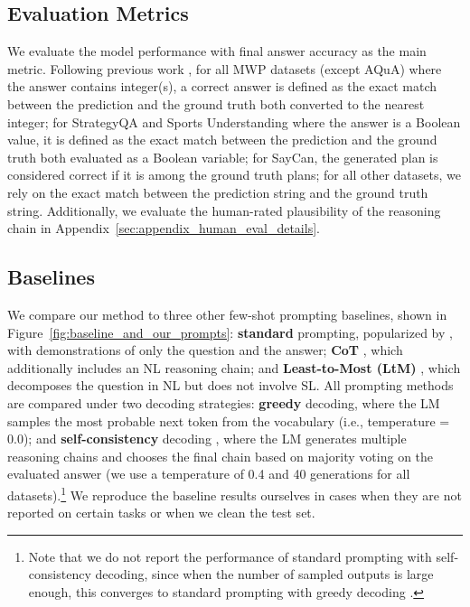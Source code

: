 \documentclass[11pt]{article}
\begin{document}
\subsection{Evaluation Metrics} We evaluate the model performance with final answer accuracy as the main metric. Following previous work \cite{wei_chain_2022, wang_self-consistency_2022, chen_program_2022}, for all MWP datasets (except AQuA) where the answer contains integer(s), a correct answer is defined as the exact match between the prediction and the ground truth both converted to the nearest integer; for StrategyQA and Sports Understanding where the answer is a Boolean value, it is defined as the exact match between the prediction and the ground truth both evaluated as a Boolean variable; for SayCan, the generated plan is considered correct if it is among the ground truth plans; for all other datasets, we rely on the exact match between the prediction string and the ground truth string. Additionally, we evaluate the human-rated plausibility of the reasoning chain in Appendix~\ref{sec:appendix_human_eval_details}.

\subsection{Baselines} We compare our method to three other few-shot prompting baselines, shown in Figure~\ref{fig:baseline_and_our_prompts}: \textbf{standard} prompting, popularized by \citet{brown_language_2020}, with demonstrations of only the question and the answer;  \textbf{CoT} \cite{wei_chain_2022}, which additionally includes an NL reasoning chain; and \textbf{Least-to-Most (LtM)} \cite{zhou_least--most_2022}, which decomposes the question in NL but does not involve SL. 
All prompting methods are compared under two decoding strategies: \textbf{greedy} decoding, where the LM samples the most probable next token from the vocabulary (i.e., temperature = 0.0); and \textbf{self-consistency} decoding \cite{wang_self-consistency_2022}, where the LM generates multiple reasoning chains and chooses the final chain based on majority voting on the evaluated answer (we use a temperature of 0.4 and 40 generations for all datasets).\footnote{Note that we do not report the performance of standard prompting with self-consistency decoding, since when the number of sampled outputs is large enough, this converges to standard prompting with greedy decoding \cite{wang_self-consistency_2022}.} We reproduce the baseline results ourselves in cases when they are not reported on certain tasks or when we clean the test set.
\end{document}
